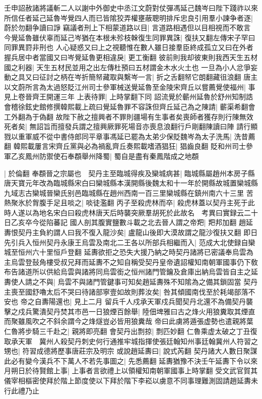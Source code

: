 壬申詔赦諸將議斬二人以謝中外御史中丞江文蔚對仗彈馮延己魏岑曰陛下踐祚以來所信任者延己延魯岑覺四人而已皆隂狡弄權壅蔽聰明排斥忠良引用羣小諫争者逐|{
	蔚於勿翻争讀曰諍}
竊議者刑上下相蒙道路以目|{
	言道路相遇但以目相視而不敢言}
今覺延魯雖伏辜而延己岑猶在本根未殄枝榦復生同罪異誅|{
	復扶又翻左傳宋子罕曰同罪異罸非刑也}
人心疑惑又曰上之視聽惟在數人雖日接羣臣終成孤立又曰在外者握兵居中者當國又曰岑覺延魯更相違戾|{
	更工衡翻}
彼前則我却彼東則我西天生五材國之利器|{
	天生五材民並用之出左傳杜預曰五材謂金木水火土也}
一旦為小人忿爭妄動之具又曰征討之柄在岑折簡帑藏取與繫岑一言|{
	折之舌翻帑它朗翻藏徂浪翻}
唐主以文蔚所言為太過怒貶江州司士參軍械送覺延魯至金陵宋齊丘以嘗薦覺使福州|{
	事見上卷晉齊王開運三年}
上表待罪|{
	上時掌翻下同}
詔流覺於蘄州延魯於舒州知制誥會稽徐鉉史館修撰韓熙載上疏曰覺延魯罪不容誅但齊丘延己為之陳請|{
	蘄渠希翻會工外翻為于偽翻}
故陛下赦之擅興者不罪則疆場有生事者矣喪師者獲存則行陳無效死者矣|{
	無詔旨而擅發兵謂之擅興厥罪死場音亦喪息浪翻行戶剛翻陳讀曰陣}
請行顯戮以重軍威不從中書侍郎同平章事馮延已罷為太弟少保貶魏岑為太子洗馬|{
	洗昔薦翻}
韓熙載屢言宋齊丘黨與必為禍亂齊丘奏熙載嗜酒猖狂|{
	猖齒良翻}
貶和州司士參軍乙亥鳳州防禦使石奉頵舉州降蜀|{
	蜀自是盡有秦鳳階成之地頵}


|{
	於倫翻}
奉頵晉之宗屬也　契丹主至臨城得疾及欒城病甚|{
	臨城縣屬趙州本房子縣唐天寶元年改為臨城縣宋白曰欒城縣本漢開縣後魏太和十一年於開縣故城置欒城縣九域志古欒城晉欒氏别邑臨城縣在趙州西南一百三里欒城縣在鎮州南六十三里}
苦熱聚氷於胷腹手足且啖之|{
	啖徒濫翻}
丙子至殺虎林而卒|{
	殺虎林蓋以契丹主死于此時人遂以為地名宋白曰殺虎林唐天后時襲突厥羣胡死於此故名　考異曰實録云二十日乙亥卒今從陷蕃記}
國人剖其腹實鹽數斗載之北去晉人謂之帝羓|{
	羓邦加翻}
趙延夀恨契丹主負約謂人曰我不復入龍沙矣|{
	盧龍山後即大漠故謂之龍沙復扶又翻}
即日先引兵入恒州契丹永康王烏雲及南北二王各以所部兵相繼而入|{
	范成大北使録自欒城至恒州六十里恒戶登翻}
延夀欲拒之恐失大援乃納之時契丹諸將已密議奉烏雲為主烏雲登鼔角樓受叔兄拜而延夀不之知自稱受契丹皇帝遺詔權知南朝軍國事仍下敎布告諸道所以供給烏雲與諸將同烏雲銜之恒州諸門管鑰及倉庫出納烏雲皆自主之延夀使人請之不與|{
	烏雲不與諸門管鍵事可知矣趙延夀殊不知隂為之備其鎖固當}
契丹主喪至國舒嚕太后不哭曰待諸部寧壹如故則葬汝矣|{
	咎其傾國南伐至於耗竭部落不安也}
帝之自夀陽還也|{
	見上二月}
留兵千人戍承天軍戍兵聞契丹北還不為備契丹襲擊之戍兵驚潰契丹焚其市邑一日狼煙百餘舉|{
	陸佃埤雅曰古之烽火用狼糞取其煙直而聚雖風吹之不斜余謂今之烽燧豈必皆用狼糞哉}
帝曰此虜將遁張虚勢也遣親將葉仁魯將步騎三千赴之|{
	親將即亮翻}
會契丹出剽掠|{
	剽匹妙翻}
仁魯乘虚太破之丁丑復取承天軍　冀州人殺契丹刺史何行通推牢城指揮使張廷翰知州事廷翰冀州人符習之甥也|{
	符習成德將歷事唐莊宗及明宗}
或說趙延夀曰|{
	說式芮翻}
契丹諸大人數日聚謀此必有變今漢兵不下萬人不若先事圖之|{
	先悉薦翻}
延夀猶豫不決壬午延夀下令以來月朔日於待賢館上事|{
	上事者言欲禮上以領權知南朝軍國事上時掌翻}
受文武官賀其儀宰相樞密使拜於階上節度使以下拜於階下李崧以虜意不同事理難測固請趙延夀未行此禮乃止

